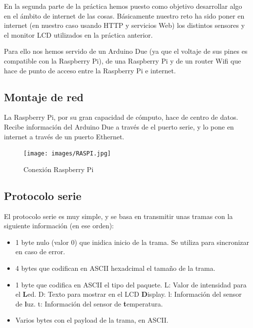 \documentclass[]{article}
\begin{document}
En la segunda parte de la práctica hemos puesto como objetivo desarrollar algo en el ámbito de internet de las cosas. Básicamente nuestro reto ha sido poner en internet (en nuestro caso usando HTTP y servicios Web) los distintos sensores y el monitor LCD utilizados en la práctica anterior.

Para ello nos hemos servido de un Arduino Due (ya que el voltaje de sus pines es compatible con la Raspberry Pi), de una Raspberry Pi y de un router Wifi que hace de punto de acceso entre la Raspberry Pi e internet.

\subsection{Montaje de red}

La Raspberry Pi, por su gran capacidad de cómputo, hace de centro de datos. Recibe información del Arduino Due a través de el puerto serie, y lo pone en internet a través de un puerto Ethernet. 

\begin{figure}[H]

\end{figure}

\begin{figure}[H]
	\centering
	\texttt{[image: images/RASPI.jpg]}
	\caption{Conexión Raspberry Pi}
	\label{fig:raspi}
\end{figure}

\subsection{Protocolo serie}

El protocolo serie es muy simple, y se basa en transmitir unas tramas con la siguiente información (en ese orden):

\begin{itemize}
	\item 1 byte nulo (valor 0) que inidica inicio de la trama. Se utiliza para sincronizar en caso de error.
	\item 4 bytes que codifican en ASCII hexadcimal el tamaño de la trama.
	\item 1 byte que codifica en ASCII el tipo del paquete.
		\subitem L: Valor de intensidad para el \textbf{L}ed.
		\subitem D: Texto para mostrar en el LCD \textbf{D}isplay.
		\subitem l: Información del sensor de \textbf{l}uz.
		\subitem t: Información del sensor de \textbf{t}emperatura.
	\item Varios bytes con el payload de la trama, en ASCII.
\end{itemize}
\end{document}
